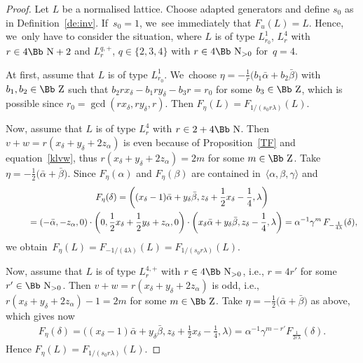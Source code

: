 \documentclass[pdftex]{sigma}
\newcommand\NN{{\mbox{\Bb N}}}
\newcommand\ZZ{{\mbox{\Bb Z}}}
\newcommand\la{\langle}
\newcommand\ra{\rangle}
\numberwithin{equation}{section}
\begin{document}
\begin{proof}
Let $L$ be a normalised lattice. Choose adapted generators and define $s_0$ as in Definition~\ref{de:inv}. If~$s_0=1$, we~see immediately that $F_u(L)=L$.
Hence, we~only have to consider the situation, where $L$ is of type $L^1_{r_0}$, $L^4_r$ with $r\in4\NN+2$ and $L^{q,+}_r$, $q\in\{2,3,4\}$ with $r\in4\NN_{>0}$ for~$q=4$.

At first, assume that $L$ is of type $L^1_{r_0}$. We~choose $\eta=-\frac1r\big({b_1}\bar\alpha+{b_2}\bar\beta\big)$ with $b_1,b_2\in\ZZ$ such that $b_2rx_\delta-b_1ry_\delta-b_3r=r_0$ for some $b_3\in\ZZ$, which is possible since $r_0=\gcd(rx_\delta,ry_\delta,r)$.
Then $F_\eta(L)=F_{1/(s_0r\lambda)}(L)$.

Now, assume that $L$ is of type $L^4_{r}$ with $r\in 2+4\NN$.
Then $v+w=r(x_\delta+y_\delta+2z_\alpha)$ is even because of Proposition~\ref{TF} and equation~\eqref{klvw}, thus $r(x_\delta+y_\delta+2z_\alpha)=2m$ for some $m\in\ZZ$.
Take $\eta=-\frac{1}{2}\big(\bar\alpha+\bar\beta\big)$.
Since $F_\eta(\alpha)$ and $F_\eta(\beta)$ are contained in~$\la \alpha,\beta,\gamma\ra$ and{\samepage
\begin{gather*}
F_\eta(\delta)= \bigg((x_\delta-1)\bar\alpha+y_\delta\bar\beta, z_\delta+\frac12 x_\delta -\frac14,\lambda\bigg)
\\ \hphantom{F_\eta(\delta)}
{}=(-\bar\alpha,-z_\alpha,0)\cdot \bigg(0,\frac12 x_\delta+\frac12 y_\delta+z_\alpha,0\bigg)\cdot \bigg(x_\delta\bar\alpha+y_\delta\bar\beta,z_\delta-\frac14,\lambda\bigg)
=\alpha^{-1}\gamma^m\,F_{-\frac1{4\lambda}}(\delta),
\end{gather*}
we obtain~$F_\eta(L)=F_{-1/(4\lambda)}(L)=F_{1/(s_0r\lambda)}(L)$.}

Now, assume that $L$ is of type $L^{4,+}_{r}$ with $r\in 4\NN_{>0}$, i.e., $r=4r'$ for some $r'\in\NN_{>0}$.
Then $v+w=r(x_\delta+y_\delta+2z_\alpha)$ is odd, i.e., $r(x_\delta+y_\delta+2z_\alpha)-1=2m$ for some $m\in\ZZ$.
Take $\eta=-\frac{1}{2}\big(\bar\alpha+\bar\beta\big)$ as above,
which gives now
\begin{gather*}
F_\eta(\delta)= \bigg((x_\delta-1)\bar\alpha+y_\delta\bar\beta, z_\delta+\frac12 x_\delta -\frac14,\lambda\bigg) = \alpha^{-1}\gamma^{m-r'} F_\frac1{2r\lambda}(\delta).
\end{gather*}
Hence $F_\eta(L)=F_{1/(s_0r\lambda)}(L)$.


\end{proof}
\end{document}
